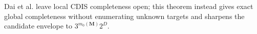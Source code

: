 Dai et al. leave local CDIS completeness open; this theorem instead gives exact global completeness without enumerating unknown targets and sharpens the candidate envelope to \(3^{m_0(\mathbf M)}2^D\).